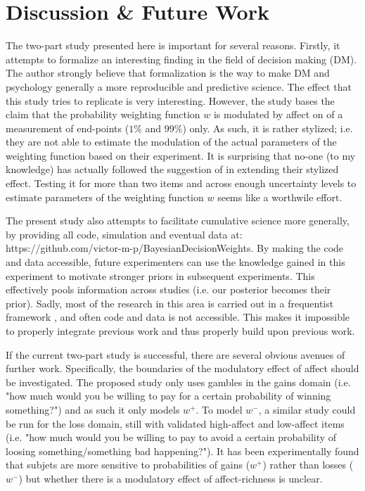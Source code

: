\documentclass[12pt]{article}
\begin{document}
\section{Discussion \& Future Work}

The two-part study presented here is important
for several reasons. Firstly, it attempts to
formalize an interesting finding in the
field of decision making (DM). The author
strongly believe that formalization is the way to
make DM and psychology generally a more
reproducible and predictive science.
The effect that this study tries to replicate
\autocite{rottenstreich2001money} is
very interesting. However, the study
bases the claim that the
probability weighting function $w$ is
modulated by affect on of a measurement of end-points
($1\%$ and $99\%$) only.
As such, it is rather stylized; i.e. they
are not able to estimate the modulation of
the actual parameters of the weighting function
based on their experiment.
It is surprising that no-one (to my knowledge)
has actually followed the suggestion
of \autocite{rottenstreich2001money} in extending
their stylized effect. Testing it for more than
two items and across enough uncertainty
levels to estimate parameters of the weighting
function $w$ seems like a worthwile effort.

\vspace{3mm}
The present study also attempts to facilitate
cumulative science more generally, by providing
all code, simulation and eventual data at:
https://github.com/victor-m-p/BayesianDecisionWeights.
By making the code and data accessible, future
experimenters can use the knowledge gained in
this experiment to motivate stronger priors in
subsequent experiments. This effectively
pools information across studies
(i.e. our posterior becomes their prior). Sadly,
most of the research in this area is carried
out in a frequentist framework
\autocite{gonzalez1999shape, rottenstreich2001money,
hsee2004music}, and often
code and data is not accessible. This makes it
impossible to properly integrate previous work
and thus properly build upon previous work.

\vspace{3mm}
If the current two-part study is successful,
there are several obvious avenues of further
work. Specifically, the boundaries of the modulatory
effect of affect should be investigated. The
proposed study
only uses gambles in the gains domain (i.e. "how
much would you be willing to pay for a
certain probability of winning something?")
and as such it only models $w^{+}$. To model
$w^{-}$, a similar
study could be run for the loss domain, still with
validated high-affect and low-affect items (i.e. "how
much would you be willing to pay to avoid a
certain probability of loosing something/something
bad happening?"). It has been experimentally
found that subjets are more sensitive to
probabilities of gains ($w^{+}$) rather than
losses ($w^{-}$) \autocite{
abdellaoui2010separating} but whether there is a
modulatory effect of affect-richness is unclear.\\
\end{document}

